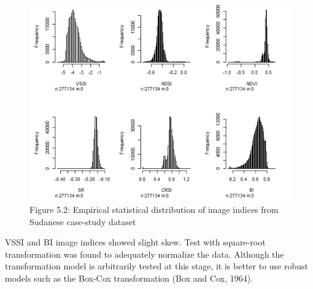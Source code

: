\documentclass[
  10pt,
  b5paper,
]{book}
\newenvironment{Shaded}{\begin{snugshade}}{\end{snugshade}}
\newcommand{\CommentTok}[1]{\textcolor[rgb]{0.56,0.35,0.01}{\textit{#1}}}
\newcommand{\DecValTok}[1]{\textcolor[rgb]{0.00,0.00,0.81}{#1}}
\newcommand{\KeywordTok}[1]{\textcolor[rgb]{0.13,0.29,0.53}{\textbf{#1}}}
\newcommand{\NormalTok}[1]{#1}
\newcommand{\OperatorTok}[1]{\textcolor[rgb]{0.81,0.36,0.00}{\textbf{#1}}}
\begin{document}
\begin{Shaded}
\end{Shaded}

\begin{figure}
\centering
\includegraphics{figures/images/Figure5.2.PNG}
\caption{Figure 5.2: Empirical statistical distribution of image indices from Sudanese case-study dataset}
\end{figure}

VSSI and BI image indices showed slight skew. Test with square-root transformation was found to adequately normalize the data. Although the transformation model is arbitrarily tested at this stage, it is better to use robust models such as the Box-Cox transformation (Box and Cox, 1964).
\end{document}
